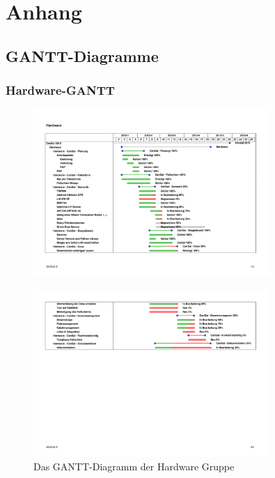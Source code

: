 \section{Anhang}

\subsection{GANTT-Diagramme}
\subsubsection {Hardware-GANTT}
\begin{figure}[htbp]
	\centering
	\includegraphics[trim = 10mm 50mm 20mm 65mm, clip,width=0.8\textwidth]{8_Anhang/hardware-gantt-1.png}
	\label{gantt_hardware_1}
\end{figure}
\vspace{-2cm}
\begin{figure}[htbp]
	\centering
	\includegraphics[trim = 11mm 350mm 20mm 40mm, clip,width=0.8\textwidth]{8_Anhang/hardware-gantt-2.png}
	\caption{Das GANTT-Diagramm der Hardware Gruppe}
	\label{gantt_hardware_2}
\end{figure}

